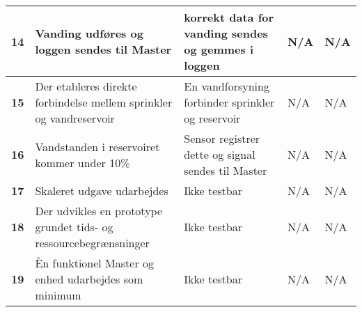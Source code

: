\begin{longtable}{|p{5mm}|p{40mm}|p{40mm}|p{20mm}|p{25mm}|}
\textbf{14}& Vanding udføres og loggen sendes til Master & korrekt data for vanding sendes og gemmes i loggen & N/A & N/A \\ 
\hline 
\textbf{15}& Der etableres direkte forbindelse mellem sprinkler og vandreservoir & En vandforsyning forbinder sprinkler og reservoir & N/A & N/A \\ 
\hline 
\textbf{16}& Vandstanden i reservoiret kommer under 10\% & Sensor registrer dette og signal sendes til Master & N/A & N/A \\ 
\hline 
\textbf{17}& Skaleret udgave udarbejdes & Ikke testbar & N/A & N/A \\ 
\hline 
\textbf{18}& Der udvikles en prototype grundet tids- og ressourcebegrænsninger & Ikke testbar & N/A & N/A \\ 
\hline
\textbf{19}& Èn funktionel Master og enhed udarbejdes som minimum & Ikke testbar & N/A & N/A \\ 
\hline 
\end{longtable}

